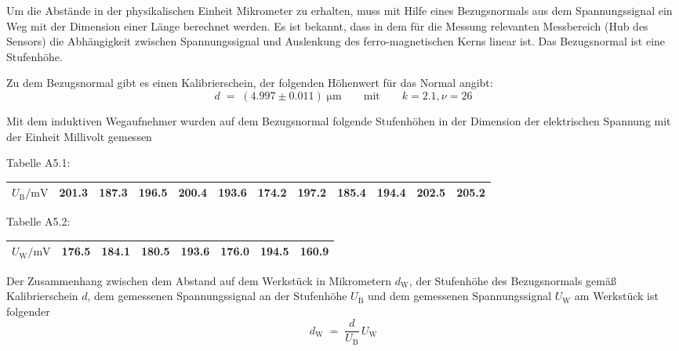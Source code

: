 Um die Abstände in der physikalischen Einheit Mikrometer zu erhalten, muss mit Hilfe
eines Bezugsnormals aus dem Spannungssignal ein Weg mit der Dimension einer Länge
berechnet werden.
Es ist bekannt, dass in dem für die Messung relevanten Messbereich (Hub des Sensors)
die Abhängigkeit zwischen Spannungssignal und Auslenkung des ferro-magnetischen Kerns
linear ist.
Das Bezugsnormal ist eine Stufenhöhe.

Zu dem Bezugsnormal gibt es einen Kalibrierschein, der folgenden Höhenwert für das
Normal angibt:
\begin{equation}
d \; = \; (4.997 \pm 0.011) \; \mathrm{\mu m} \qquad \mathrm{mit} \qquad k = 2.1, \nu = 26
\label{kalBezug}
\end{equation}

Mit dem induktiven Wegaufnehmer wurden auf dem Bezugsnormal folgende Stufenhöhen in
der Dimension der elektrischen Spannung mit der Einheit Millivolt gemessen

Tabelle A5.1:\\
\begin{tabular}{c||c|c|c|c|c|c|c|c|c|c|c}
\hline
$U_\mathrm{B} / \mathrm{mV}$ & 201.3 & 187.3 & 196.5 & 200.4 & 193.6 & 174.2 & 197.2 & 185.4 & 194.4 & 202.5 & 205.2\\
\hline
\end{tabular}

Tabelle A5.2:\\
\begin{tabular}{c||c|c|c|c|c|c|c}
\hline
$U_\mathrm{W} / \mathrm{mV}$ & 176.5 & 184.1 & 180.5 & 193.6 & 176.0 & 194.5 & 160.9 \\
\hline
\end{tabular}

Der Zusammenhang zwischen dem Abstand auf dem Werkstück in Mikrometern $d_\mathrm{W}$,
der Stufenhöhe des Bezugsnormals gemäß Kalibrierschein $d$, dem gemessenen Spannungssignal
an der Stufenhöhe $U_\mathrm{B}$ und dem gemessenen Spannungssignal $U_\mathrm{W}$ am Werkstück
ist folgender
\begin{equation}
d_\mathrm{W} \; = \; \frac{d}{U_\mathrm{B}} \, U_\mathrm{W}
\end{equation}


